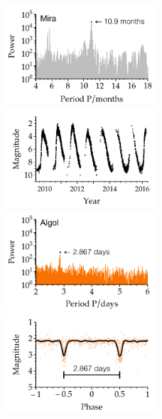 \begin{figure}[p] 
    \centering

    \includegraphics[width=0.5\textwidth]{figs/pgrams/mira_pgram.pdf}%
    \includegraphics[width=0.5\textwidth]{figs/pgrams/mira_lc.pdf}\\%
    \vspace*{0.4cm}
    \includegraphics[width=0.5\textwidth]{figs/pgrams/algol_pgram.pdf}%
    \includegraphics[width=0.5\textwidth]{figs/pgrams/algol_phased.pdf}\\%

\end{figure}
